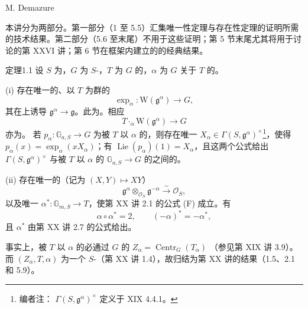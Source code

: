 \begin{center}M. Demazure\end{center}
本讲分为两部分。第一部分（1 至 5.5）汇集唯一性定理与存在性定理的证明所需的技术结果。第二部分（5.6 至末尾）不用于这些证明；第 5 节末尾尤其将用于讨论的第 XXVI 讲；第 6 节在框架内建立的的经典结果。
\begin{SGAresult}{定理}{1.1}
设 $S$ 为，$G$ 为 $S$-，$T$ 为 $G$ 的，$\alpha$ 为 $G$ 关于 $T$ 的。

(i) 存在唯一的、以 $T$ 为群的
\[\exp_\alpha:\mathrm W(\mathfrak g^\alpha)\longrightarrow G,\]
其在上诱导 $\mathfrak g^\alpha\to\mathfrak g$。此为。相应
\[T\mathbin{\cdot_\alpha}\mathrm W(\mathfrak g^\alpha)\longrightarrow G\]
亦为。
若 $p_\alpha:\mathbb G_{a,S}\to G$ 为被 $T$ 以 $\alpha$ 的，则存在唯一 $X_\alpha\in\Gamma(S,\mathfrak g^\alpha)^\times$\footnote{编者注： $\Gamma(S,\mathfrak g^\alpha)^\times$ 定义于 XIX 4.4.1。}，使得 $p_\alpha(x)=\exp_\alpha(xX_\alpha)$；有 $\operatorname{Lie}(p_\alpha)(1)=X_\alpha$，且这两个公式给出 $\Gamma(S,\mathfrak g^\alpha)^\times$ 与被 $T$ 以 $\alpha$ 的 $\mathbb G_{a,S}\to G$ 的之间的。

(ii) 存在唯一的（记为 $(X,Y)\mapsto XY$）
\[\mathfrak g^\alpha\otimes_{\mathcal O_S}\mathfrak g^{-\alpha}\xrightarrow{\sim}\mathcal O_S,\]
以及唯一 $\alpha^*:\mathbb G_{m,S}\to T$，使第 XX 讲 2.1 的公式 (F) 成立。有
\[\alpha\circ\alpha^*=2,\qquad(-\alpha)^*=-\alpha^*,\]
且 $\alpha^*$ 由第 XX 讲 2.7 的公式给出。
\end{SGAresult}
事实上，被 $T$ 以 $\alpha$ 的必通过 $G$ 的 $Z_\alpha=\operatorname{Centr}_G(T_\alpha)$ （参见第 XIX 讲 3.9）。而 $(Z_\alpha,T,\alpha)$ 为一个 $S$-（第 XX 讲 1.4），故归结为第 XX 讲的结果（1.5、2.1 和 5.9）。

